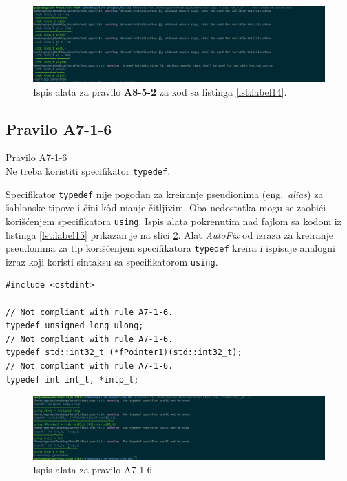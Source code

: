 \documentclass[12pt,oneside]{memoir}
\begin{document}
\begin{figure}[!h]
\begin{center}
\includegraphics[scale=0.3]{A8-5-2.png}
\end{center}
\caption{Ispis alata za pravilo \textbf{A8-5-2} za kod sa listinga \ref{lst:label14}.}
\label{fig:A8-5-2}
\end{figure}

\subsection{Pravilo A7-1-6}
\begin{center}
\begin{tcolorbox}
Pravilo A7-1-6 \\
Ne treba koristiti specifikator \texttt{typedef}. 
\end{tcolorbox}
\end{center}

Specifikator \texttt{typedef} nije pogodan za kreiranje pseudionima (eng.~\textit{alias}) za \v{s}ablonske tipove i \v{c}ini k\^{o}d manje \v{c}itljivim.
Oba nedostatka mogu se zaobi\'{c}i kori\v{s}\'{c}enjem specifikatora \texttt{using}.  Ispis alata pokrenutim nad fajlom sa kodom iz listinga \ref{lst:label15} prikazan je na slici \ref{fig:A7-1-6}. Alat \textit{AutoFix} od izraza za kreiranje pseudonima za tip kori\v{s}\'{c}enjem
specifikatora \texttt{typedef} kreira i ispisuje analogni izraz koji koristi sintaksu sa specifikatorom \texttt{using}.

\begin{lstlisting}[style=customc, caption={Primer koda koji nije napisan u skladu sa pravilom \textbf{A7-1-6}, odnosno koristi specifikator \texttt{typedef}.}, label=lst:label15]
#include <cstdint>

// Not compliant with rule A7-1-6.
typedef unsigned long ulong;
// Not compliant with rule A7-1-6.
typedef std::int32_t (*fPointer1)(std::int32_t);
// Not compliant with rule A7-1-6.
typedef int int_t, *intp_t;

\end{lstlisting}

\begin{figure}[!h]
\begin{center}
\includegraphics[scale=0.3]{A7-1-6.png}
\end{center}
\caption{Ispis alata za pravilo A7-1-6}
\label{fig:A7-1-6}
\end{figure}
\end{document}
